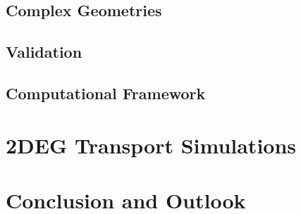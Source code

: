 \section{Complex Geometries}

\section{Validation}\label{sec:validation}

\section{Computational Framework}

\chapter{2DEG Transport Simulations}

\chapter{Conclusion and Outlook}

\appendix


\clearpage




